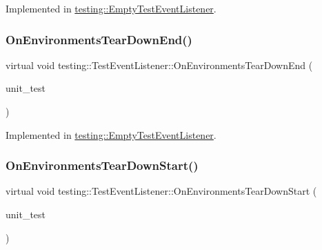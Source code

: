 Implemented in \hyperlink{classtesting_1_1EmptyTestEventListener_a6e498ae763ac8c1a46bd861e0b7ff3f5}{testing\+::\+Empty\+Test\+Event\+Listener}.

\mbox{\label{classtesting_1_1TestEventListener_a9ea04fa7f447865ba76df35e12ba2092}} 
\subsubsection{\texorpdfstring{On\+Environments\+Tear\+Down\+End()}{OnEnvironmentsTearDownEnd()}}
{\footnotesize\ttfamily virtual void testing\+::\+Test\+Event\+Listener\+::\+On\+Environments\+Tear\+Down\+End (\begin{DoxyParamCaption}\item[{const \hyperlink{classtesting_1_1UnitTest}{Unit\+Test} \&}]{unit\+\_\+test }\end{DoxyParamCaption})\hspace{0.3cm}{\ttfamily [pure virtual]}}



Implemented in \hyperlink{classtesting_1_1EmptyTestEventListener_ad9984052e82c3ae26395a2d9480326d2}{testing\+::\+Empty\+Test\+Event\+Listener}.

\mbox{\label{classtesting_1_1TestEventListener_a468b5e6701bcb86cb2c956caadbba5e4}} 
\subsubsection{\texorpdfstring{On\+Environments\+Tear\+Down\+Start()}{OnEnvironmentsTearDownStart()}}
{\footnotesize\ttfamily virtual void testing\+::\+Test\+Event\+Listener\+::\+On\+Environments\+Tear\+Down\+Start (\begin{DoxyParamCaption}\item[{const \hyperlink{classtesting_1_1UnitTest}{Unit\+Test} \&}]{unit\+\_\+test }\end{DoxyParamCaption})\hspace{0.3cm}{\ttfamily [pure virtual]}}



